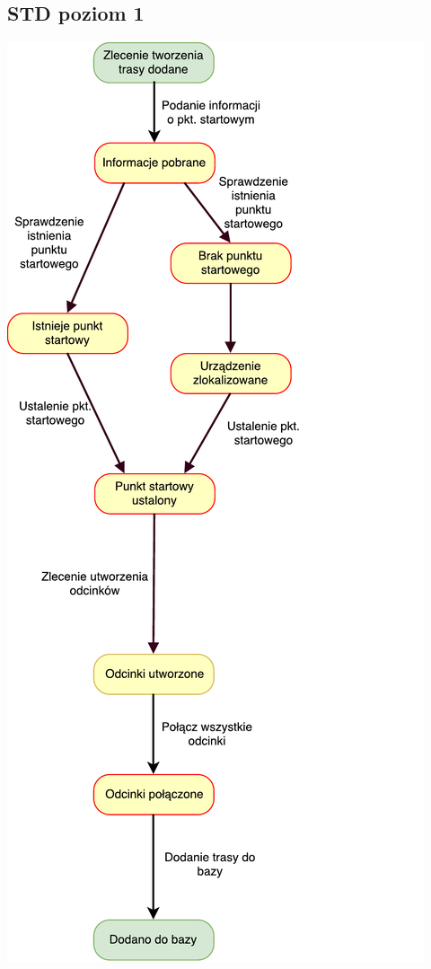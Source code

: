 \documentclass[11pt]{article}
\begin{document}
	\subsection{STD poziom 1}
	\begin{center}
		\includegraphics[scale=0.9]{STD2.pdf}
	\end{center}
	\newpage
\end{document}
